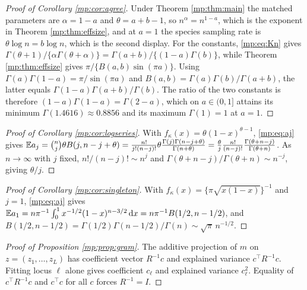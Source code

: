 \begin{proof}[Proof of Corollary \ref{mp:cor:agree}]
Under Theorem \ref{mp:thm:main} the matched parameters are $\alpha=1-a$ and $\theta=a+b-1$, so
$n^{\alpha}=n^{1-a}$, which is the exponent in Theorem \ref{mp:thm:effsize}, and at $a=1$ the
species sampling rate is $\theta\log n=b\log n$, which is the second display. For the
constants, \eqref{mp:eq:Kn} gives
$\Gamma(\theta+1)/\{\alpha\Gamma(\theta+\alpha)\}=\Gamma(a+b)/\{(1-a)\Gamma(b)\}$, while
Theorem \ref{mp:thm:effsize} gives $\pi/\{B(a,b)\sin(\pi a)\}$. Using
$\Gamma(a)\Gamma(1-a)=\pi/\sin(\pi a)$ and $B(a,b)=\Gamma(a)\Gamma(b)/\Gamma(a+b)$, the
latter equals $\Gamma(1-a)\Gamma(a+b)/\Gamma(b)$. The ratio of the two constants is therefore
$(1-a)\Gamma(1-a)=\Gamma(2-a)$, which on $a\in(0,1]$ attains its minimum
$\Gamma(1.4616)\approx0.8856$ and its maximum $\Gamma(1)=1$ at $a=1$.
\end{proof}

\begin{proof}[Proof of Corollary \ref{mp:cor:logseries}]
With $f_\kappa(x)=\theta(1-x)^{\theta-1}$, \eqref{mp:eq:aj} gives
$\mathbb{E} a_j=\binom{n}{j}\theta B(j,n-j+\theta)
=\frac{n!}{j!(n-j)!}\theta\frac{\Gamma(j)\Gamma(n-j+\theta)}{\Gamma(n+\theta)}
=\frac{\theta}{j}\frac{n!}{(n-j)!}\frac{\Gamma(\theta+n-j)}{\Gamma(\theta+n)}$.
As $n\to\infty$ with $j$ fixed, $n!/(n-j)!\sim n^j$ and
$\Gamma(\theta+n-j)/\Gamma(\theta+n)\sim n^{-j}$, giving $\theta/j$.
\end{proof}

\begin{proof}[Proof of Corollary \ref{mp:cor:singleton}]
With $f_\kappa(x)=\{\pi\sqrt{x(1-x)}\}^{-1}$ and $j=1$, \eqref{mp:eq:aj} gives
$\mathbb{E} a_1=n\pi^{-1}\int_0^1x^{-1/2}(1-x)^{n-3/2}\,\mathrm{d} x=n\pi^{-1}B(1/2,n-1/2)$, and
$B(1/2,n-1/2)=\Gamma(1/2)\Gamma(n-1/2)/\Gamma(n)\sim\sqrt\pi\,n^{-1/2}$.
\end{proof}

\begin{proof}[Proof of Proposition \ref{mp:prop:gram}]
The additive projection of $m$ on $z=(z_1,\dots,z_L)$ has coefficient vector $R^{-1}c$ and
explained variance $c^\top R^{-1}c$. Fitting locus $\ell$ alone gives coefficient $c_\ell$
and explained variance $c_\ell^2$. Equality of $c^\top R^{-1}c$ and $c^\top c$ for all $c$
forces $R^{-1}=I$.
\end{proof}

